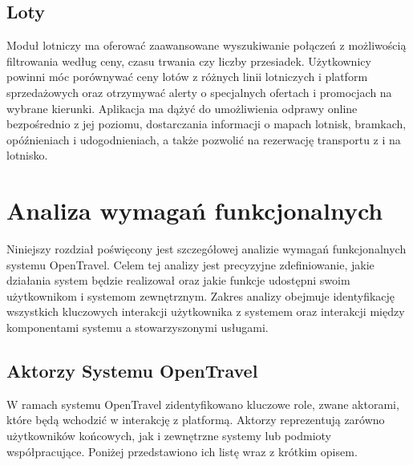 \documentclass[a4paper,12pt]{article}
\begin{document}
\subsection*{Loty}
Moduł lotniczy ma oferować zaawansowane wyszukiwanie połączeń z możliwością filtrowania według ceny, czasu trwania czy liczby przesiadek.
Użytkownicy powinni móc porównywać ceny lotów z różnych linii lotniczych i platform sprzedażowych oraz otrzymywać alerty o specjalnych ofertach i promocjach na wybrane kierunki.
Aplikacja ma dążyć do umożliwienia odprawy online bezpośrednio z jej poziomu, dostarczania informacji o mapach lotnisk, bramkach, opóźnieniach i udogodnieniach, a także pozwolić na rezerwację transportu z i na lotnisko.

\newpage
\section{Analiza wymagań funkcjonalnych}
Niniejszy rozdział poświęcony jest szczegółowej analizie wymagań funkcjonalnych systemu OpenTravel. Celem tej analizy jest precyzyjne zdefiniowanie, jakie działania system będzie realizował oraz jakie funkcje udostępni swoim użytkownikom i systemom zewnętrznym. Zakres analizy obejmuje identyfikację wszystkich kluczowych interakcji użytkownika z systemem oraz interakcji między komponentami systemu a stowarzyszonymi usługami.

\subsection{Aktorzy Systemu OpenTravel}
W ramach systemu OpenTravel zidentyfikowano kluczowe role, zwane aktorami, które będą wchodzić w interakcję z platformą. Aktorzy reprezentują zarówno użytkowników końcowych, jak i zewnętrzne systemy lub podmioty współpracujące. Poniżej przedstawiono ich listę wraz z krótkim opisem.
\end{document}
